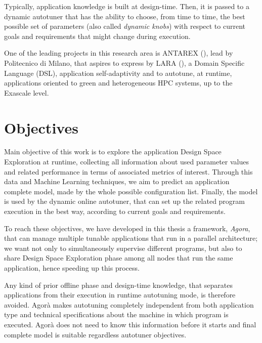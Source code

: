 Typically, application knowledge is built at design-time. Then, it is passed to a dynamic autotuner that has the ability to choose, from time to time, the best possible set of parameters (also called \textit{dynamic knobs}) with respect to current goals and requirements that might change during execution.

One of the leading projects in this research area is ANTAREX (\cite{silvano2016antarex}), lead by Politecnico di Milano, that aspires to express by LARA (\cite{cardoso2012lara, cardoso2014performance}), a Domain Specific Language (DSL), application self-adaptivity and to autotune, at runtime, applications oriented to green and heterogeneous HPC systems, up to the Exascale level.





\section{Objectives}

Main objective of this work is to explore the application Design Space Exploration at runtime, collecting all information about used parameter values and related performance in terms of associated metrics of interest. Through this data and Machine Learning techniques, we aim to predict an application complete model, made by the whole possible configuration list. Finally, the model is used by the dynamic online autotuner, that can set up the related program execution in the best way, according to current goals and requirements.

To reach these objectives, we have developed in this thesis a framework, \textit{Agora}, that can manage multiple tunable applications that run in a parallel architecture; we want not only to simultaneously supervise different programs, but also to share Design Space Exploration phase among all nodes that run the same application, hence speeding up this process.

Any kind of prior offline phase and design-time knowledge, that separates applications from their execution in runtime autotuning mode, is therefore avoided. Agorà makes autotuning completely independent from both application type and technical specifications about the machine in which program is executed. Agorà does not need to know this information before it starts and final complete model is suitable regardless autotuner objectives.





